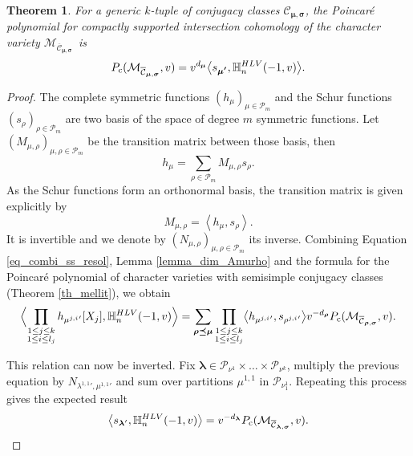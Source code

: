 \documentclass[11pt]{article}
\newcommand{\rc}{\mathrm{c}}
\newcommand{\HLV}{\textup{HLV}}
\newcommand{\blangle}{\bigl\langle}
\newcommand{\brangle}{\bigr\rangle}
\theoremstyle{definition}
\theoremstyle{plain}
\newtheorem{theorem}[definition]{Theorem}
\newcommand{\Part}{\mathcal{P}}
\begin{document}
\begin{theorem}\label{th_sect_poincare}
For a generic $k$-tuple of conjugacy classes ${\mathcal{C}}_{\boldsymbol{\mu},\boldsymbol{\sigma}}$, the Poincaré polynomial for compactly supported intersection cohomology of the character variety $\mathcal{M}_{\overline{\mathcal{C}}_{\boldsymbol{\mu},\boldsymbol{\sigma}}}$~is
\[
P_{\rc}(\mathcal{M}_{\overline{\mathcal{C}}_{\boldsymbol{\mu},\boldsymbol{\sigma}}},v) = v^{d_{\boldsymbol{\mu}}}\blangle s_{\boldsymbol{\mu'}}, \mathbb{H}_n^{\HLV}(-1,v)\brangle.
\]
\end{theorem}
\begin{proof}
The complete symmetric functions $(h_{\mu})_{\mu\in \Part_m}\!$ and the Schur functions $(s_{\rho})_{\rho\in\Part_m}\!$ are two basis of the space of degree $m$ symmetric functions. Let $(M_{\mu,\rho})_{\mu,\rho\in\Part_m }$ be the transition matrix between those basis, then
\[
h_{\mu} = \sum_{\rho \in\Part_m} M_{\mu,\rho} s_{\rho}.
\]
As the Schur functions form an orthonormal basis, the transition matrix is given explicitly by
\[
M_{\mu,\rho} = \left\langle h_{\mu},s_{\rho}\right\rangle.
\]
It is invertible and we denote by $(N_{\mu,\rho})_{\mu,\rho \in \Part_m }$ its inverse. Combining Equation \eqref{eq_combi_ss_resol}, Lemma \ref{lemma_dim_Amurho} and the formula for the Poincaré polynomial of character varieties with semisimple conjugacy classes (Theorem \ref{th_mellit}), we obtain
\[
\Bigl\langle \prod_{\substack{1 \le j \le k \\ 1 \le i \le l_j}} h_{ {\mu^{j,i}}'}[X_j],\mathbb{H}_n^{\HLV}(-1,v)\Bigr\rangle = \sum_{\boldsymbol{\rho\preceq\mu}} \prod_{\substack{1 \le j \le k \\ 1 \le i \le l_j}}\blangle h_{ {\mu^{ j,i}}' }, s_{ {\rho^{ j,i}}' }\brangle v^{-d_{\boldsymbol{\rho}}} P_{\rc}(\mathcal{M}_{\overline{\mathcal{C}}_{\boldsymbol{\rho},\boldsymbol{\sigma}}}, v).
\]

This relation can now be inverted. Fix $\boldsymbol{\lambda}\in \Part_{\nu^1}\times\dots\times\Part_{\nu^k}$, multiply the previous equation by $N_{{\lambda^{1,1}}',{\mu^{1,1}}'}$ and sum over partitions ${\mu^{1,1}}$ in $ \Part_{\nu^1_1}$. Repeating this process gives the expected result
\[
\left\langle s_{\boldsymbol{\lambda}'}, \mathbb{H}_n^{\HLV}(-1,v)\right\rangle = v^{-d_{\boldsymbol{\lambda}}} P_{\rc}(\mathcal{M}_{\overline{\mathcal{C}}_{\boldsymbol{\lambda},\boldsymbol{\sigma}}}, v).
\]


\end{proof}
\end{document}
